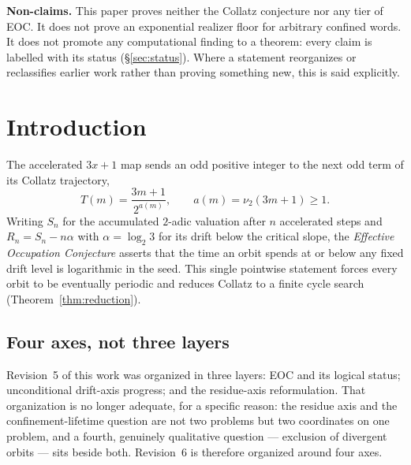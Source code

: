 \documentclass[11pt]{article}
\theoremstyle{plain}
\theoremstyle{definition}
\theoremstyle{remark}
\newcommand{\al}{\alpha}
\begin{document}
\begin{abstract}
Neither EOC nor the Collatz conjecture is proved here. The surviving frontier is actual
positive-orbit arithmetic at three nested levels: qualitative exclusion of an infinite
zero-corridor tail, quantitative control of single-window lifetime, and control of separated
returns sufficient for full occupation.
\end{abstract}

\noindent\textbf{Non-claims.} This paper proves neither the Collatz conjecture nor any tier of EOC.
It does not prove an exponential realizer floor for arbitrary confined words. It does not promote
any computational finding to a theorem: every claim is labelled with its status
(\S\ref{sec:status}). Where a statement reorganizes or reclassifies earlier work rather than
proving something new, this is said explicitly.

\tableofcontents

\section{Introduction}\label{sec:intro}

The accelerated $3x+1$ map sends an odd positive integer to the next odd term of its Collatz
trajectory,
\[
T(m)=\frac{3m+1}{2^{a(m)}},\qquad a(m)=\nu_2(3m+1)\ge 1 .
\]
Writing $S_n$ for the accumulated $2$-adic valuation after $n$ accelerated steps and
$R_n=S_n-n\al$ with $\al=\log_2 3$ for its drift below the critical slope, the \emph{Effective
Occupation Conjecture} asserts that the time an orbit spends at or below any fixed drift level is
logarithmic in the seed. This single pointwise statement forces every orbit to be eventually
periodic and reduces Collatz to a finite cycle search (Theorem~\ref{thm:reduction}).

\subsection{Four axes, not three layers}

Revision~5 of this work was organized in three layers: EOC and its logical status; unconditional
drift-axis progress; and the residue-axis reformulation. That organization is no longer adequate,
for a specific reason: the residue axis and the confinement-lifetime question are not two problems
but two coordinates on one problem, and a fourth, genuinely qualitative question --- exclusion of
divergent orbits --- sits beside both. Revision~6 is therefore organized around four axes.
\end{document}
